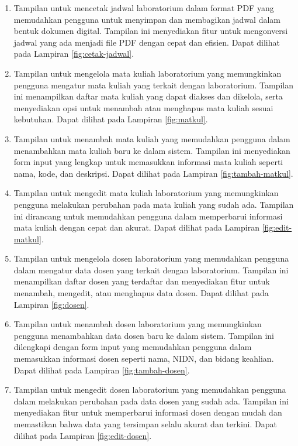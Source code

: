 \begin{enumerate}
	\item Tampilan untuk mencetak jadwal laboratorium dalam format PDF yang memudahkan pengguna untuk menyimpan dan membagikan jadwal dalam bentuk dokumen digital. Tampilan ini menyediakan fitur untuk mengonversi jadwal yang ada menjadi file PDF dengan cepat dan efisien. Dapat dilihat pada Lampiran \ref{fig:cetak-jadwal}.

	\item Tampilan untuk mengelola mata kuliah laboratorium yang memungkinkan pengguna mengatur mata kuliah yang terkait dengan laboratorium. Tampilan ini menampilkan daftar mata kuliah yang dapat diakses dan dikelola, serta menyediakan opsi untuk menambah atau menghapus mata kuliah sesuai kebutuhan. Dapat dilihat pada Lampiran \ref{fig:matkul}.

	\item Tampilan untuk menambah mata kuliah yang memudahkan pengguna dalam menambahkan mata kuliah baru ke dalam sistem. Tampilan ini menyediakan form input yang lengkap untuk memasukkan informasi mata kuliah seperti nama, kode, dan deskripsi. Dapat dilihat pada Lampiran \ref{fig:tambah-matkul}.

	\item Tampilan untuk mengedit mata kuliah laboratorium yang memungkinkan pengguna melakukan perubahan pada mata kuliah yang sudah ada. Tampilan ini dirancang untuk memudahkan pengguna dalam memperbarui informasi mata kuliah dengan cepat dan akurat. Dapat dilihat pada Lampiran \ref{fig:edit-matkul}.

	\item Tampilan untuk mengelola dosen laboratorium yang memudahkan pengguna dalam mengatur data dosen yang terkait dengan laboratorium. Tampilan ini menampilkan daftar dosen yang terdaftar dan menyediakan fitur untuk menambah, mengedit, atau menghapus data dosen. Dapat dilihat pada Lampiran \ref{fig:dosen}.

	\item Tampilan untuk menambah dosen laboratorium yang memungkinkan pengguna menambahkan data dosen baru ke dalam sistem. Tampilan ini dilengkapi dengan form input yang memudahkan pengguna dalam memasukkan informasi dosen seperti nama, NIDN, dan bidang keahlian. Dapat dilihat pada Lampiran \ref{fig:tambah-dosen}.

	\item Tampilan untuk mengedit dosen laboratorium yang memudahkan pengguna dalam melakukan perubahan pada data dosen yang sudah ada. Tampilan ini menyediakan fitur untuk memperbarui informasi dosen dengan mudah dan memastikan bahwa data yang tersimpan selalu akurat dan terkini. Dapat dilihat pada Lampiran \ref{fig:edit-dosen}.

\end{enumerate}

